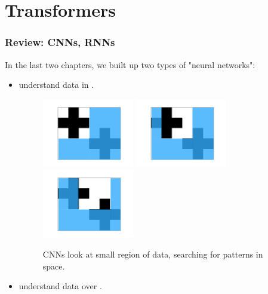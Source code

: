 \setcounter{chapter}{11-1} 

\chapter{Transformers}

\subsection{Review: CNNs, RNNs}

    In the last two chapters, we built up two types of "neural networks":

    \begin{itemize}
        \item {} understand data in .

        \begin{figure}[H]
            \includegraphics[width=40mm,scale=0.5]{images/convolutional_neural_networks_images/window.png}
            \includegraphics[width=40mm,scale=0.5]{images/convolutional_neural_networks_images/window2.png}
            \includegraphics[width=40mm,scale=0.5]{images/convolutional_neural_networks_images/window3.png}
            
            \caption*{CNNs look at small region of data, searching for patterns in space.}
        \end{figure}

        \item {} understand data over .


\end{itemize}
